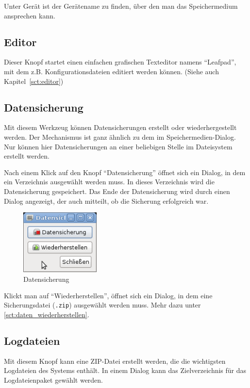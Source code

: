 \documentclass[a4paper,12pt,twoside]{article}
\begin{document}
Unter Gerät ist der Gerätename zu finden, über den man das
Speichermedium ansprechen kann.


\subsection{Editor}
\label{sct:gui_editor}
Dieser Knopf startet einen einfachen
grafischen Texteditor namens "`Leafpad"', mit
dem z.B. Konfigurationsdateien editiert werden können. (Siehe auch
Kapitel~\ref{sct:editor})


\subsection{Datensicherung}
\label{sct:dialog_datensicherung}
Mit diesem Werkzeug können
Datensicherungen erstellt oder wiederhergestellt werden. Der
Mechanismus ist ganz ähnlich zu dem im Speichermedien-Dialog. Nur
können hier Datensicherungen an einer beliebigen Stelle im Dateisystem
erstellt werden.

Nach einem Klick auf den Knopf
"`Datensicherung"' öffnet sich ein Dialog, in
dem ein Verzeichnis ausgewählt werden muss. In dieses Verzeichnis wird
die Datensicherung gespeichert. Das Ende der Datensicherung wird durch
einen Dialog angezeigt, der auch mitteilt, ob die Sicherung erfolgreich
war.

\begin{figure}
    \centering
    \includegraphics[width=4cm]{efaLivede-img/efaLivede-img21.png}
    \caption{Datensicherung}
    \label{fig:dialog_datensicherung}
\end{figure}

Klickt man auf "`Wiederherstellen"', öffnet
sich ein Dialog, in dem eine Sicherungsdatei (\texttt{.zip})
ausgewählt werden muss. Mehr dazu unter \ref{sct:daten_wiederherstellen}.


\subsection{Logdateien}
\label{sct:logfiles}
Mit diesem Knopf kann eine ZIP-Datei erstellt werden, die die wichtigsten
Logdateien des Systems enthält. In einem Dialog kann das Zielverzeichnis 
für das Logdateienpaket gewählt werden.
\end{document}
